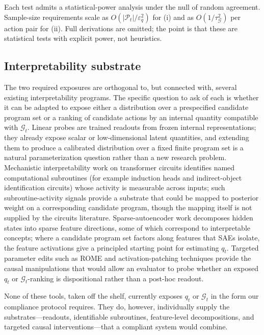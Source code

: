 \documentclass[11pt]{article}
\theoremstyle{remark}
\newcommand{\Gcal}{\mathcal{G}}
\begin{document}
Each test admits a statistical-power analysis under the null of random agreement. Sample-size requirements scale as \(O(|\mathcal{P}_t|/\varepsilon_q^2)\) for (i) and as \(O(1/\tau_\Gcal^2)\) per action pair for (ii). Full derivations are omitted; the point is that these are statistical tests with explicit power, not heuristics.

\subsection{Interpretability substrate}

The two required exposures are orthogonal to, but connected with, several existing interpretability programs. The specific question to ask of each is whether it can be adapted to expose either a distribution over a prespecified candidate program set or a ranking of candidate actions by an internal quantity compatible with \(\Gcal_t\). Linear probes \citep{AlainBengio2017,BelinkovGlass2019} are trained readouts from frozen internal representations; they already expose scalar or low-dimensional latent quantities, and extending them to produce a calibrated distribution over a fixed finite program set is a natural parameterization question rather than a new research problem. Mechanistic interpretability work on transformer circuits \citep{OlssonEtAl2022InductionHeads,WangEtAl2023Circuits} identifies named computational subroutines (for example induction heads and indirect-object identification circuits) whose activity is measurable across inputs; such subroutine-activity signals provide a substrate that could be mapped to posterior weight on a corresponding candidate program, though the mapping itself is not supplied by the circuits literature. Sparse-autoencoder work \citep{CunninghamEtAl2023SAE,TempletonEtAl2024Scaling} decomposes hidden states into sparse feature directions, some of which correspond to interpretable concepts; where a candidate program set factors along features that SAEs isolate, the feature activations give a principled starting point for estimating \(q_t\). Targeted parameter edits such as ROME \citep{MengEtAl2022ROME} and activation-patching techniques provide the causal manipulations that would allow an evaluator to probe whether an exposed \(q_t\) or \(\Gcal_t\)-ranking is dispositional rather than a post-hoc readout.

None of these tools, taken off the shelf, currently exposes \(q_t\) or \(\Gcal_t\) in the form our compliance protocol requires. They do, however, individually supply the substrates---readouts, identifiable subroutines, feature-level decompositions, and targeted causal interventions---that a compliant system would combine.
\end{document}
